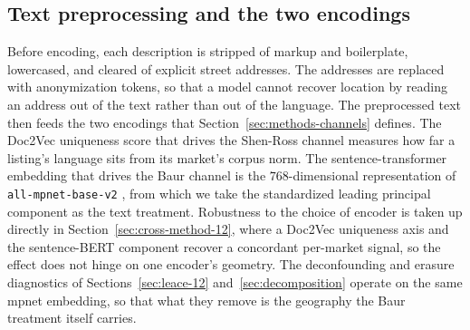 \subsection{Text preprocessing and the two encodings}

Before encoding, each description is stripped of markup and boilerplate,
lowercased, and cleared of explicit street addresses. The addresses are replaced
with anonymization tokens, so that a model cannot recover location by reading an
address out of the text rather than out of the language. The preprocessed text
then feeds the two encodings that Section~\ref{sec:methods-channels} defines. The
Doc2Vec uniqueness score that drives the Shen-Ross channel measures how far a
listing's language sits from its market's corpus norm. The sentence-transformer
embedding that drives the Baur channel is the $768$-dimensional representation of
\texttt{all-mpnet-base-v2} \citep{reimers2019sentence}, from which we take the
standardized leading principal component as the text treatment. Robustness to the
choice of encoder is taken up directly in Section~\ref{sec:cross-method-12}, where
a Doc2Vec uniqueness axis and the sentence-BERT component recover a concordant
per-market signal, so the effect does not hinge on one encoder's geometry. The
deconfounding and erasure diagnostics of Sections~\ref{sec:leace-12}
and~\ref{sec:decomposition} operate on the same mpnet embedding, so that what they
remove is the geography the Baur treatment itself carries.
